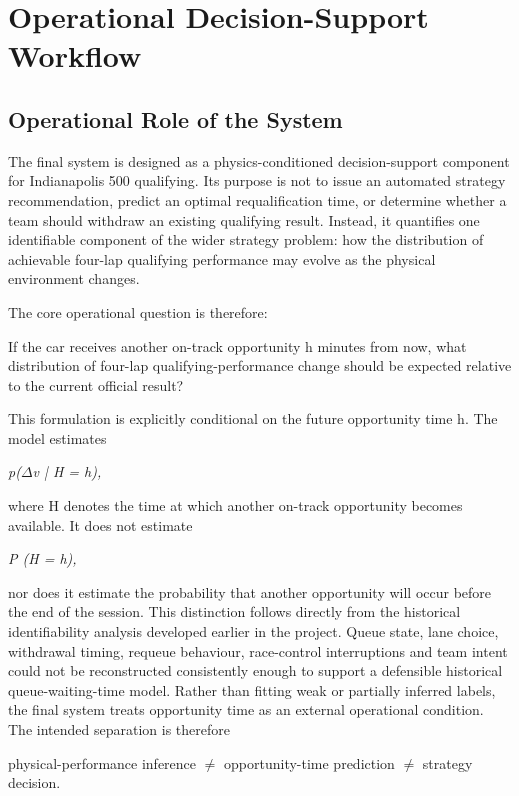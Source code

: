 \section{Operational Decision-Support Workflow}

\subsection{Operational Role of the System}
The final system is designed as a physics-conditioned decision-support component for Indianapolis 500 qualifying. Its purpose is not to issue an automated strategy recommendation, predict an optimal requalification time, or determine whether a team should withdraw an existing qualifying result. Instead, it quantifies one identifiable component of the wider strategy problem: how the distribution of achievable four-lap qualifying performance may evolve as the physical environment changes.

The core operational question is therefore:

If the car receives another on-track opportunity h minutes from now, what distribution of four-lap qualifying-performance change should be expected relative to the current official result?

This formulation is explicitly conditional on the future opportunity time h. The model estimates

\begin{center}\textit{p(\ensuremath{\Delta}v | H = h),}\end{center}

where H denotes the time at which another on-track opportunity becomes available. It does not estimate

\begin{center}\textit{P (H = h),}\end{center}

nor does it estimate the probability that another opportunity will occur before the end of the session. This distinction follows directly from the historical identifiability analysis developed earlier in the project. Queue state, lane choice, withdrawal timing, requeue behaviour, race-control interruptions and team intent could not be reconstructed consistently enough to support a defensible historical queue-waiting-time model. Rather than fitting weak or partially inferred labels, the final system treats opportunity time as an external operational condition. The intended separation is therefore

physical-performance inference \ensuremath{\neq} opportunity-time prediction \ensuremath{\neq} strategy decision.

